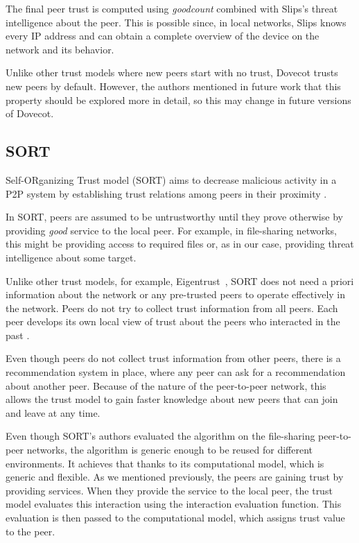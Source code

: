 The final peer trust is computed using \textit{goodcount} combined with Slips's threat intelligence about the peer. 
This is possible since, in local networks, Slips knows every IP address and can obtain a complete overview of the device on the network and its behavior.

Unlike other trust models where new peers start with no trust, Dovecot trusts new peers by default. 
However, the authors mentioned in future work that this property should be explored more in detail, so this may change in future versions of Dovecot.

\subsection{SORT}
\label{subsec:sort}
Self-ORganizing Trust model (SORT) aims to decrease malicious activity in a P2P system by establishing trust relations among peers in their proximity \cite{sort}.

In SORT, peers are assumed to be untrustworthy until they prove otherwise by providing \textit{good} service to the local peer. 
For example, in file-sharing networks, this might be providing access to required files or, as in our case, providing threat intelligence about some target.

Unlike other trust models, for example, Eigentrust~\cite{kamvar2003eigentrust}, SORT does not need a priori information about the network or any pre-trusted peers to operate effectively in the network.
Peers do not try to collect trust information from all peers.
Each peer develops its own local view of trust about the peers who interacted in the past \cite{sort}.

Even though peers do not collect trust information from other peers, there is a recommendation system in place, where any peer can ask for a recommendation about another peer.
Because of the nature of the peer-to-peer network, this allows the trust model to gain faster knowledge about new peers that can join and leave at any time.

Even though SORT's authors evaluated the algorithm on the file-sharing peer-to-peer networks, the algorithm is generic enough to be reused for different environments.
It achieves that thanks to its computational model, which is generic and flexible.
As we mentioned previously, the peers are gaining trust by providing services. 
When they provide the service to the local peer, the trust model evaluates this interaction using the interaction evaluation function.
This evaluation is then passed to the computational model, which assigns trust value to the peer.

